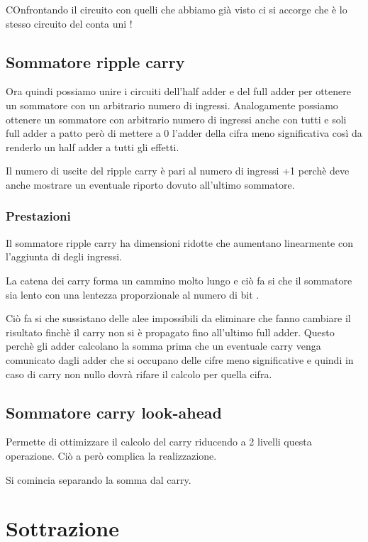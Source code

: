 \documentclass[a4paper]{book}
\begin{document}
COnfrontando il circuito con quelli che abbiamo già visto ci si accorge che è lo stesso circuito del conta uni !

\subsection{Sommatore ripple carry}
Ora quindi possiamo unire i circuiti dell'half adder e del full adder per ottenere un sommatore con un arbitrario numero di ingressi.
Analogamente possiamo ottenere un sommatore con arbitrario numero di ingressi anche con tutti e soli full adder a patto però di mettere a 0 l'adder della cifra meno significativa così da renderlo un half adder a tutti gli effetti.

Il numero di uscite del ripple carry è pari al numero di ingressi +1 perchè deve anche mostrare un eventuale riporto dovuto all'ultimo sommatore.


\subsubsection*{Prestazioni}

Il sommatore ripple carry ha dimensioni ridotte che aumentano linearmente con l'aggiunta di degli ingressi.

La catena dei carry forma un cammino molto lungo e ciò fa si che il sommatore sia lento con una lentezza proporzionale al numero di bit .

Ciò fa si che sussistano delle alee impossibili da eliminare che fanno cambiare il risultato finchè il carry non si è propagato fino all'ultimo full adder.
Questo perchè gli adder calcolano la somma prima che un eventuale carry venga comunicato dagli adder che si occupano delle cifre meno significative e quindi in caso di carry non nullo dovrà rifare il calcolo per quella cifra.


\subsection{Sommatore carry look-ahead}

Permette di ottimizzare il calcolo del carry riducendo a 2 livelli questa operazione. Ciò a però complica la realizzazione.

Si comincia separando la somma dal carry. 


\section{Sottrazione}
\end{document}

